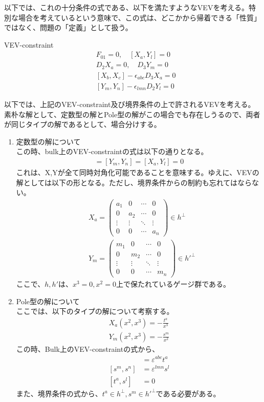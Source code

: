 \documentclass[dvipdfmx,a4paper,10.5pt]{article}
\numberwithin{equation}{section}
\begin{document}
以下では、これの十分条件の式である、以下を満たすようなVEVを考える。特別な場合を考えているという意味で、この式は、どこかから帰着できる「性質」ではなく、問題の「定義」として扱う。
\begin{defbox}{VEV-constraint}
\begin{align*}
    &F_{01}=0,\quad [X_{a},Y_{l}]=0\\
    &D_{2}X_{a}=0,\quad D_{3}Y_{m}=0\\
    &[X_{b},X_{c}]-\epsilon_{abc}D_{3}X_{a}=0\\
    &[Y_{m},Y_{n}]-\epsilon_{lmn}D_{2}Y_{l}=0
\end{align*}
\end{defbox}
以下では、上記のVEV-constraint及び境界条件の上で許されるVEVを考える。\\
素朴な解として、定数型の解とPole型の解がこの場合でも存在しうるので、両者が同じタイプの解であるとして、場合分けする。
\begin{enumerate}
    \item 定数型の解について\\
    この時、bulk上のVEV-constraintの式は以下の通りとなる。
    \begin{align*}
        [X_{b},X_{c}]=[Y_{m},Y_{n}]=[X_{a},Y_{l}]=0
    \end{align*}
    これは、X,Yが全て同時対角化可能であることを意味する。ゆえに、VEVの解としては以下の形となる。ただし、境界条件からの制約も忘れてはならない。
    \begin{align*}
        &X_{a}=\begin{pmatrix}
a_1 & 0 & \cdots & 0 \\
0 & a_2 & \cdots & 0 \\
\vdots & \vdots & \ddots & \vdots \\
0 & 0 & \cdots & a_n
\end{pmatrix}\in h^{\perp}\\
&Y_{m}=\begin{pmatrix}
m_1 & 0 & \cdots & 0 \\
0 & m_2 & \cdots & 0 \\
\vdots & \vdots & \ddots & \vdots \\
0 & 0 & \cdots & m_n
\end{pmatrix}\in h'^{\perp}
    \end{align*}
    ここで、$h,h'$は、$x^{3}=0,x^{2}=0$上で保たれているゲージ群である。
    \item Pole型の解について\\
    ここでは、以下のタイプの解について考察する。
    \begin{align*}
        X_{a}(x^{2},x^{3})=-\frac{t^{a}}{x^{3}}\\
        Y_{m}(x^{2},x^{3})=-\frac{s^{m}}{x^{2}}
    \end{align*}
    この時、Bulk上のVEV-constraintの式から、
    \begin{align*}
        [t^{b},t^{c}]&=\varepsilon^{abc}t^{a}\\
        [s^{m},s^{n}]&=\varepsilon^{lmn}s^{l}\\
        [t^{a},s^{l}]&=0
    \end{align*}
    また、境界条件の式から、$t^{a}\in h^{\perp},s^{m}\in h'^{\perp}$である必要がある。
\end{enumerate}
\end{document}
